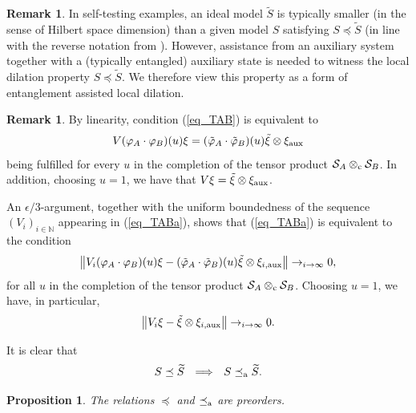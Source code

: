 \documentclass[11pt]{amsart}
\newtheorem{proposition}[theorem]{Proposition}
\theoremstyle{definition}
\newtheorem{remark}[theorem]{Remark}
\newcommand{\cl}[1]{\mathcal{#1}}
\newcommand{\bb}[1]{\mathbb{#1}}
\providecommand{\wt}[1]{\widetilde{#1}}
\begin{document}
\begin{remark} In self-testing examples, an ideal model $\wt{S}$ is typically smaller (in the sense of Hilbert space dimension) than a given model $S$ satisfying $S\preceq\wt{S}$ (in line with the reverse notation from \cite{pszz}). However, assistance from an auxiliary system together with a (typically entangled) auxiliary state is needed to witness the local dilation property $S\preceq \wt{S}$. We therefore view this property as a form of entanglement assisted local dilation.
\end{remark}


\begin{remark}\label{r_someap}
\rm 
By linearity, condition (\ref{eq_TAB}) is equivalent to 
$$V(\varphi_A\cdot\varphi_B)(u)\xi = 
(\tilde\varphi_A\cdot\tilde\varphi_B)(u)\tilde\xi \otimes\xi_{\rm aux}$$
being fulfilled for every $u$ in the 
completion of the tensor product $\cl S_A\otimes_{\rm c} \cl S_B$.
In addition, choosing $u = 1$, we have that 
$V\xi = \tilde{\xi}\otimes \xi_{\rm aux}$.

An $\epsilon/3$-argument, together with the uniform boundedness of the 
sequence $(V_i)_{i\in \bb{N}}$ appearing in (\ref{eq_TABa}), shows that 
(\ref{eq_TABa}) is equivalent to the condition
\begin{equation}\label{eq_arbu}
\left\|V_i (\varphi_A\cdot\varphi_B)(u) \xi - 
(\tilde\varphi_A\cdot\tilde\varphi_B)(u)\tilde\xi \otimes\xi_{i,\rm aux}\right\|\to_{i\to \infty} 0,
\end{equation}
for all $u$ in the completion of the tensor product $\cl S_A\otimes_{\rm c} \cl S_B$. 
Choosing $u = 1$, we have, in particular, 
$$\left\|V_i \xi - \tilde\xi \otimes\xi_{i,\rm aux}\right\|\to_{i\to \infty} 0.$$
\end{remark}

\noindent It is clear that 
$$S\preceq \wt{S} \ \ \Longrightarrow \ \ S\preceq_{\rm a} \wt{S}.$$



\begin{proposition}\label{p_preorder}
The relations $\preceq$ and $\preceq_{\rm a}$ are preorders.    
\end{proposition}
\end{document}
